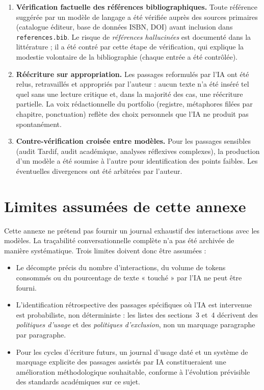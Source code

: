 \begin{enumerate}
  \item \textbf{Vérification factuelle des références bibliographiques.} Toute référence suggérée par un modèle de langage a été vérifiée auprès des sources primaires (catalogue éditeur, base de données ISBN, DOI) avant inclusion dans \texttt{references.bib}. Le risque de \emph{références hallucinées} est documenté dans la littérature ; il a été contré par cette étape de vérification, qui explique la modestie volontaire de la bibliographie (chaque entrée a été contrôlée).
  \item \textbf{Réécriture sur appropriation.} Les passages reformulés par l'IA ont été relus, retravaillés et appropriés par l'auteur : aucun texte n'a été inséré tel quel sans une lecture critique et, dans la majorité des cas, une réécriture partielle. La voix rédactionnelle du portfolio (registre, métaphores filées par chapitre, ponctuation) reflète des choix personnels que l'IA ne produit pas spontanément.
  \item \textbf{Contre-vérification croisée entre modèles.} Pour les passages sensibles (audit Tardif, audit académique, analyses réflexives complexes), la production d'un modèle a été soumise à l'autre pour identification des points faibles. Les éventuelles divergences ont été arbitrées par l'auteur.
\end{enumerate}

\section{Limites assumées de cette annexe}

Cette annexe ne prétend pas fournir un journal exhaustif des interactions avec les modèles. La traçabilité conversationnelle complète n'a pas été archivée de manière systématique. Trois limites doivent donc être assumées :

\begin{itemize}
  \item Le décompte précis du nombre d'interactions, du volume de tokens consommés ou du pourcentage de texte « touché » par l'IA ne peut être fourni.
  \item L'identification rétrospective des passages spécifiques où l'IA est intervenue est probabiliste, non déterministe : les listes des sections~3 et~4 décrivent des \emph{politiques d'usage} et des \emph{politiques d'exclusion}, non un marquage paragraphe par paragraphe.
  \item Pour les cycles d'écriture futurs, un journal d'usage daté et un système de marquage explicite des passages assistés par IA constitueraient une amélioration méthodologique souhaitable, conforme à l'évolution prévisible des standards académiques sur ce sujet.
\end{itemize}


